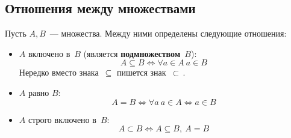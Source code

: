\subsection{Отношения между множествами}
Пусть $A, B$~--- множества. Между ними определены следующие отношения:
\begin{itemize}
	\item $A$ включено в~$B$ (является \textbf{подмножеством}~$B$):
	\begin{equation*}
	A \subseteq B \Leftrightarrow \forall a \in A \ a \in B
	\end{equation*}
	Нередко вместо знака~$\subseteq$ пишется знак~$\subset$\,.
	
	\item $A$ равно $B$:
	\begin{equation*}
	A = B \Leftrightarrow \forall a \ a \in A \Leftrightarrow a \in B
	\end{equation*}
	
	\item $A$ строго включено в~$B$:
	\begin{equation*}
	A \subset B \Leftrightarrow A \subseteq B, \ A = B
	\end{equation*}
\end{itemize}
